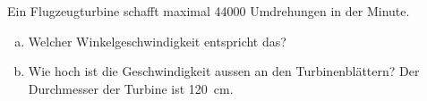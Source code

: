 
\begin{aufgabe}
\label{flugzeugturbine}
	Ein Flugzeugturbine schafft maximal \num{44000} Umdrehungen in der Minute.
	\begin{enumerate} [a)]
		\item Welcher Winkelgeschwindigkeit entspricht das?
		\item Wie hoch ist die Geschwindigkeit aussen an den Turbinenblättern? Der Durchmesser der Turbine ist \SI{120}{cm}.
	\end{enumerate}
\end{aufgabe}
